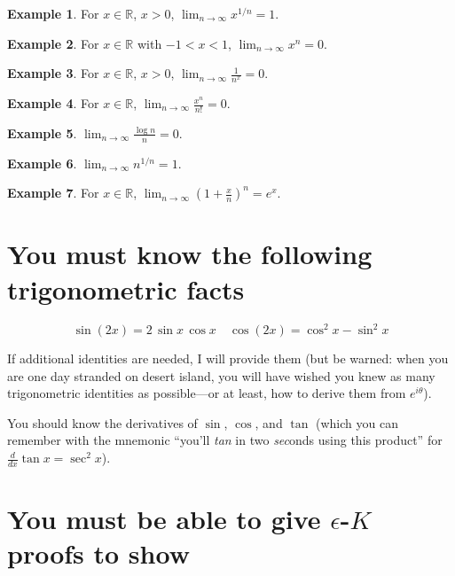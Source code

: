 \documentclass[12pt]{article}
\theoremstyle{definition}
\newtheorem*{example*}{Example}
\newcommand{\limn}{\displaystyle\lim_{n \to \infty}}
\newcommand{\R}{\mathbb{R}}
\begin{document}
\begin{multicols}{2}
\begin{example*}
For $x \in \R$, $x > 0$,
$\limn x^{1/n} = 1$.
\end{example*}

\begin{example*}
For $x \in \R$ with $-1 < x < 1$,
$\limn x^n = 0$.
\end{example*}

\begin{example*}
For $x \in \R$, $x > 0$,
$\limn \frac{1}{n^x} = 0$.
\end{example*}

\begin{example*}
For $x \in \R$,
$\limn \frac{x^n}{n!} = 0$.
\end{example*}

\begin{example*}
$\limn \displaystyle\frac{\log n}{n} = 0$.
\end{example*}

\begin{example*}
$\limn n^{1/n} = 1$.
\end{example*}

\begin{example*}
For $x \in \R$,
$\limn \left( 1 + \frac{x}{n} \right)^n = e^x$.
\end{example*}
\end{multicols}

\section*{You must know the following trigonometric facts}

$$
\sin (2x) = 2\,\sin x\,\cos x \hspace{1em} \cos (2x) = \cos^2 x - \sin^2 x
$$

If additional identities are needed, I will provide them (but be
warned: when you are one day stranded on desert island, you will have
wished you knew as many trigonometric identities as possible---or at least, how to derive them from $e^{i\theta}$).

You should know the derivatives of $\sin$, $\cos$, and $\tan$ (which
you can remember with the mnemonic ``you'll \textit{tan} in two
\textit{sec}onds using this product'' for $\displaystyle\frac{d}{dx} \tan x = \sec^2 x$).

\section*{You must be able to give $\epsilon$-$K$ proofs to show}
\end{document}
